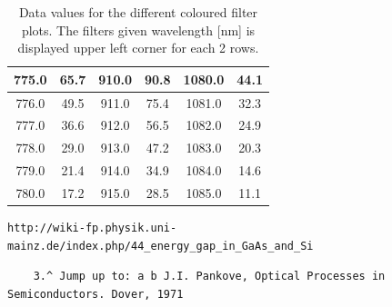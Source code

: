 \documentclass[]{article}
\begin{document}
\begin{table}[H]
\begin{tabular}{|c|c||c|c||c|c|}
775.0 & 65.7 & 910.0 & 90.8 & 1080.0 & 44.1 \\ \hline
776.0 & 49.5 & 911.0 & 75.4 & 1081.0 & 32.3 \\ \hline
777.0 & 36.6 & 912.0 & 56.5 & 1082.0 & 24.9 \\ \hline
778.0 & 29.0 & 913.0 & 47.2 & 1083.0 & 20.3 \\ \hline
779.0 & 21.4 & 914.0 & 34.9 & 1084.0 & 14.6 \\ \hline
780.0 & 17.2 & 915.0 & 28.5 & 1085.0 & 11.1 \\ \hline
\hline
\end{tabular}
\caption{Data values for the different coloured filter plots. The filters given wavelength [nm] is displayed upper left corner for each 2 rows. }
\end{table}


\newpage
\begin{thebibliography}{}

 \begin{verbatim}
http://wiki-fp.physik.uni-mainz.de/index.php/44_energy_gap_in_GaAs_and_Si
\end{verbatim} 
\begin{verbatim}
	3.^ Jump up to: a b J.I. Pankove, Optical Processes in Semiconductors. Dover, 1971
\end{verbatim}



\end{thebibliography}
\end{document}
